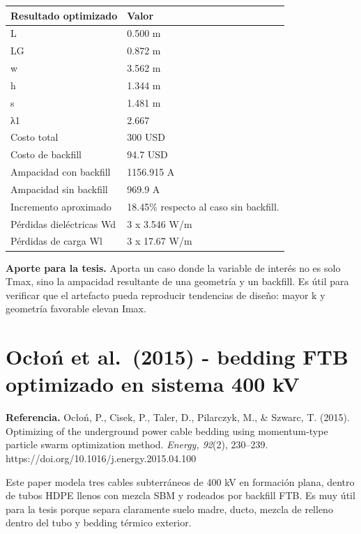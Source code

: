 \documentclass[11pt,a4paper,oneside]{report}
\begin{document}
\begin{longtable}[]{@{}ll@{}}
\toprule\noalign{}
Resultado optimizado & Valor \\
\midrule\noalign{}
\endhead
\bottomrule\noalign{}
\endlastfoot
L & 0.500 m \\
LG & 0.872 m \\
w & 3.562 m \\
h & 1.344 m \\
s & 1.481 m \\
λ1 & 2.667 \\
Costo total & 300 USD \\
Costo de backfill & 94.7 USD \\
Ampacidad con backfill & 1156.915 A \\
Ampacidad sin backfill & 969.9 A \\
Incremento aproximado & 18.45\% respecto al caso sin backfill. \\
Pérdidas dieléctricas Wd & 3 x 3.546 W/m \\
Pérdidas de carga Wl & 3 x 17.67 W/m \\
\end{longtable}

\textbf{Aporte para la tesis.} Aporta un caso donde la variable de
interés no es solo Tmax, sino la ampacidad resultante de una geometría y
un backfill. Es útil para verificar que el artefacto pueda reproducir
tendencias de diseño: mayor k y geometría favorable elevan Imax.

\section{Ocłoń et al.~(2015) - bedding FTB optimizado en sistema 400
kV}\label{ocux142oux144-et-al.-2015---bedding-ftb-optimizado-en-sistema-400-kv}

\textbf{Referencia.} Ocłoń, P., Cisek, P., Taler, D., Pilarczyk, M., \&
Szwarc, T. (2015). Optimizing of the underground power cable bedding
using momentum-type particle swarm optimization method. \emph{Energy,
92}(2), 230--239. https://doi.org/10.1016/j.energy.2015.04.100

Este paper modela tres cables subterráneos de 400 kV en formación plana,
dentro de tubos HDPE llenos con mezcla SBM y rodeados por backfill FTB.
Es muy útil para la tesis porque separa claramente suelo madre, ducto,
mezcla de relleno dentro del tubo y bedding térmico exterior.
\end{document}
